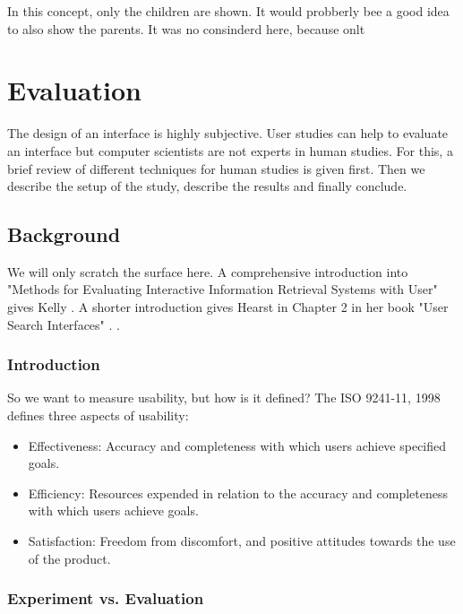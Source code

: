 \documentclass[11pt]{report}
\begin{document}
In this concept, only the children are shown. It would probberly bee a good idea to also show the parents. It was no consinderd here, because onlt

\chapter{Evaluation}
\label{Evaluation}

The design of an interface is highly subjective. User studies can help to evaluate an interface but computer scientists are not experts in human studies. For this, a brief review of different techniques for human studies is given first. Then we describe the setup of the study, describe the results and finally conclude. \\

\section{Background}

We will only scratch the surface here. A comprehensive introduction into "Methods for Evaluating Interactive Information Retrieval Systems with User" gives Kelly \cite{Kelly2007}. A shorter introduction gives Hearst in Chapter 2 in her book "User Search Interfaces" . \cite{Hearst2009}.\\

\subsection{Introduction}

So we want to measure usability, but how is it defined? The ISO 9241-11, 1998 \cite{ISO} defines three aspects of usability:
\begin{itemize}
	\item Effectiveness: Accuracy and completeness with which users achieve specified goals.
	\item Efficiency: Resources expended in relation to the accuracy and completeness with which users achieve goals.
	\item Satisfaction: Freedom from discomfort, and positive attitudes towards the use of the product.
\end{itemize}

\subsection{Experiment vs. Evaluation}
\end{document}
